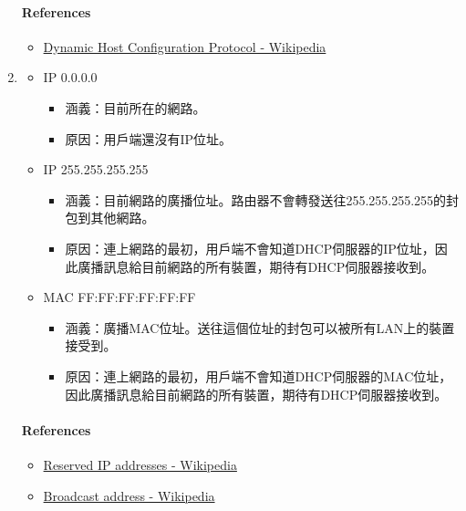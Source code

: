 \documentclass[12pt, a4paper]{article}
\begin{document}
\begin{enumerate}
    \paragraph{References}
    \begin{itemize}
      \item \href{https://en.wikipedia.org/wiki/Dynamic_Host_Configuration_Protocol}{Dynamic Host Configuration Protocol - Wikipedia}
    \end{itemize}
    \item
    \begin{itemize}
      \item IP 0.0.0.0
      \begin{itemize}
        \item 涵義：目前所在的網路。
        \item 原因：用戶端還沒有IP位址。
      \end{itemize}
      \item IP 255.255.255.255
      \begin{itemize}
        \item 涵義：目前網路的廣播位址。路由器不會轉發送往255.255.255.255的封包到其他網路。
        \item 原因：連上網路的最初，用戶端不會知道DHCP伺服器的IP位址，因此廣播訊息給目前網路的所有裝置，期待有DHCP伺服器接收到。
      \end{itemize}
      \item MAC FF:FF:FF:FF:FF:FF
      \begin{itemize}
        \item 涵義：廣播MAC位址。送往這個位址的封包可以被所有LAN上的裝置接受到。
        \item 原因：連上網路的最初，用戶端不會知道DHCP伺服器的MAC位址，因此廣播訊息給目前網路的所有裝置，期待有DHCP伺服器接收到。
      \end{itemize}
    \end{itemize}

    \paragraph{References}
    \begin{itemize}
      \item \href{https://en.wikipedia.org/wiki/Reserved_IP_addresses}{Reserved IP addresses - Wikipedia}
      \item \href{https://en.wikipedia.org/wiki/Broadcast_address}{Broadcast address - Wikipedia}
    \end{itemize}


\end{enumerate}
\end{document}
